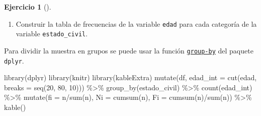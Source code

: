\documentclass[
  a4paper,
]{scrreport}
\newenvironment{Shaded}{\begin{snugshade}}{\end{snugshade}}
\newcommand{\AttributeTok}[1]{\textcolor[rgb]{0.40,0.45,0.13}{#1}}
\newcommand{\DecValTok}[1]{\textcolor[rgb]{0.68,0.00,0.00}{#1}}
\newcommand{\FunctionTok}[1]{\textcolor[rgb]{0.28,0.35,0.67}{#1}}
\newcommand{\NormalTok}[1]{\textcolor[rgb]{0.00,0.23,0.31}{#1}}
\newcommand{\SpecialCharTok}[1]{\textcolor[rgb]{0.37,0.37,0.37}{#1}}
\providecommand{\tightlist}{%
  \setlength{\itemsep}{0pt}\setlength{\parskip}{0pt}}\usepackage{longtable,booktabs,array}
\theoremstyle{definition}
\newtheorem{exercise}{Ejercicio}[chapter]
\theoremstyle{remark}
\begin{document}
\begin{exercise}[]
\begin{tcolorbox}
\end{tcolorbox}

\begin{enumerate}
\def\labelenumi{\alph{enumi}.}
\setcounter{enumi}{1}
\tightlist
\item
  Construir la tabla de frecuencias de la variable \texttt{edad} para
  cada categoría de la variable \texttt{estado\_civil}.
\end{enumerate}

\begin{tcolorbox}[enhanced jigsaw, coltitle=black, breakable, bottomtitle=1mm, colbacktitle=quarto-callout-tip-color!10!white, rightrule=.15mm, opacityback=0, opacitybacktitle=0.6, left=2mm, colframe=quarto-callout-tip-color-frame, title=\textcolor{quarto-callout-tip-color}{\faLightbulb}\hspace{0.5em}{Solución}, toprule=.15mm, toptitle=1mm, arc=.35mm, colback=white, titlerule=0mm, bottomrule=.15mm, leftrule=.75mm]

Para dividir la muestra en grupos se puede usar la función
\href{https://aprendeconalf.es/manual-r/06-preprocesamiento.html\#res\%C3\%BAmenes-por-grupos}{\texttt{group-by}}
del paquete \texttt{dplyr}.

\begin{Shaded}
\begin{Highlighting}[]
\FunctionTok{library}\NormalTok{(dplyr)}
\FunctionTok{library}\NormalTok{(knitr)}
\FunctionTok{library}\NormalTok{(kableExtra)}
\FunctionTok{mutate}\NormalTok{(df, }\AttributeTok{edad\_int =} \FunctionTok{cut}\NormalTok{(edad, }\AttributeTok{breaks =} \FunctionTok{seq}\NormalTok{(}\DecValTok{20}\NormalTok{, }\DecValTok{80}\NormalTok{, }\DecValTok{10}\NormalTok{))) }\SpecialCharTok{\%\textgreater{}\%}
    \FunctionTok{group\_by}\NormalTok{(estado\_civil) }\SpecialCharTok{\%\textgreater{}\%}
    \FunctionTok{count}\NormalTok{(edad\_int) }\SpecialCharTok{\%\textgreater{}\%} 
    \FunctionTok{mutate}\NormalTok{(}\AttributeTok{fi =}\NormalTok{ n}\SpecialCharTok{/}\FunctionTok{sum}\NormalTok{(n), }\AttributeTok{Ni =} \FunctionTok{cumsum}\NormalTok{(n), }\AttributeTok{Fi =} \FunctionTok{cumsum}\NormalTok{(n)}\SpecialCharTok{/}\FunctionTok{sum}\NormalTok{(n)) }\SpecialCharTok{\%\textgreater{}\%}
    \FunctionTok{kable}\NormalTok{()}
\end{Highlighting}
\end{Shaded}


\end{tcolorbox}
\end{exercise}
\end{document}
